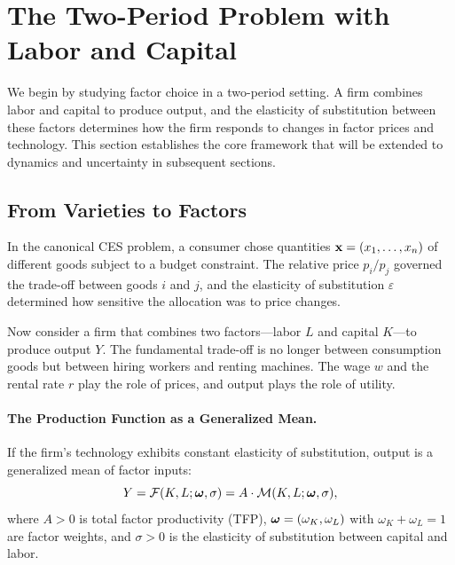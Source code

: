 \section{The Two-Period Problem with Labor and Capital}
\label{sec:lc-two-period}

We begin by studying factor choice in a two-period setting. A firm combines labor and capital to produce output, and the elasticity of substitution between these factors determines how the firm responds to changes in factor prices and technology. This section establishes the core framework that will be extended to dynamics and uncertainty in subsequent sections.

\subsection{From Varieties to Factors}
\label{subsec:varieties-to-factors}

In the canonical CES problem, a consumer chose quantities $\mathbf{x} = (x_1, \ldots, x_n)$ of different goods subject to a budget constraint. The relative price $p_i/p_j$ governed the trade-off between goods $i$ and $j$, and the elasticity of substitution $\varepsilon$ determined how sensitive the allocation was to price changes.

Now consider a firm that combines two factors---labor $L$ and capital $K$---to produce output $Y$. The fundamental trade-off is no longer between consumption goods but between hiring workers and renting machines. The wage $w$ and the rental rate $r$ play the role of prices, and output plays the role of utility.

\paragraph{The Production Function as a Generalized Mean.}
If the firm's technology exhibits constant elasticity of substitution, output is a generalized mean of factor inputs:
\begin{equation}
Y = \mathcal{F}(K, L; \boldsymbol{\omega}, \sigma) = A \cdot \mathcal{M}(K, L; \boldsymbol{\omega}, \sigma),
\label{eq:ces-production}
\end{equation}
where $A > 0$ is total factor productivity (TFP), $\boldsymbol{\omega} = (\omega_K, \omega_L)$ with $\omega_K + \omega_L = 1$ are factor weights, and $\sigma > 0$ is the elasticity of substitution between capital and labor.

